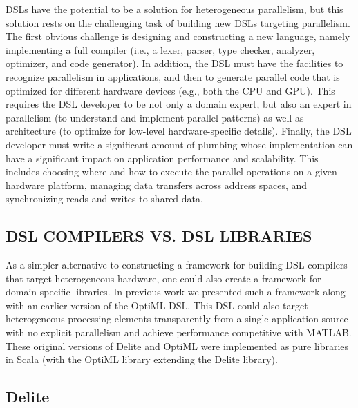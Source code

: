 DSLs have the potential to be a solution for heterogeneous
parallelism, but this solution rests on the challenging task of
building new DSLs targeting parallelism. The first obvious
challenge is designing and constructing a new language,
namely implementing a full compiler (i.e., a lexer, parser, type
checker, analyzer, optimizer, and code generator). In addition,
the DSL must have the facilities to recognize parallelism
in applications, and then to generate parallel code that is
optimized for different hardware devices (e.g., both the CPU
and GPU). This requires the DSL developer to be not only a
domain expert, but also an expert in parallelism (to understand
and implement parallel patterns) as well as architecture (to
optimize for low-level hardware-specific details). Finally, the
DSL developer must write a significant amount of plumbing
whose implementation can have a significant impact on application performance and scalability. This includes choosing
where and how to execute the parallel operations on a given
hardware platform, managing data transfers across address
spaces, and synchronizing reads and writes to shared data.



\subsection{DSL COMPILERS VS. DSL LIBRARIES}

As a simpler alternative to constructing a framework for
building DSL compilers that target heterogeneous hardware,
one could also create a framework for domain-specific libraries. 
In previous work we presented such a framework
along with an earlier version of the OptiML DSL. This
DSL could also target heterogeneous processing elements
transparently from a single application source with no explicit 
parallelism and achieve performance competitive with
MATLAB. These original versions of Delite and OptiML were
implemented as pure libraries in Scala (with the OptiML
library extending the Delite library).






\subsection{Delite}


